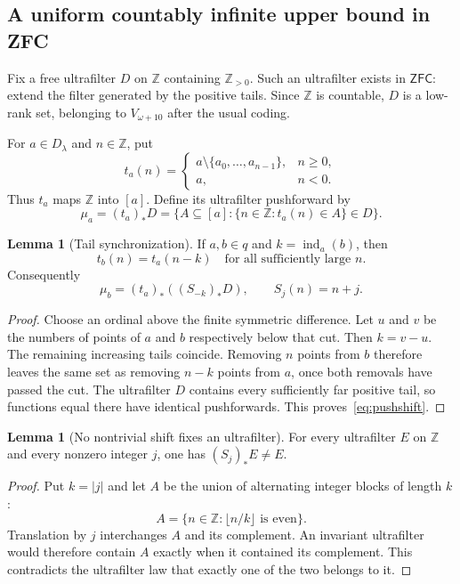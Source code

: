 \documentclass[11pt,letterpaper]{article}
\theoremstyle{definition}
\newtheorem{lemma}[definition]{Lemma}
\numberwithin{equation}{section}
\newcommand{\ZFC}{\mathsf{ZFC}}
\newcommand{\ind}{\operatorname{ind}}
\begin{document}
\subsection{A uniform countably infinite upper bound in ZFC}

Fix a free ultrafilter $D$ on $\mathbb Z$ containing $\mathbb Z_{>0}$. Such an ultrafilter exists in $\ZFC$: extend the filter generated by the positive tails. Since $\mathbb Z$ is countable, $D$ is a low-rank set, belonging to $V_{\omega+10}$ after the usual coding.

For $a\in D_\lambda$ and $n\in\mathbb Z$, put
\[
 t_a(n)=
 \begin{cases}
 a\setminus\{a_0,\ldots,a_{n-1}\},&n\geq0,\\
 a,&n<0.
 \end{cases}
\]
Thus $t_a$ maps $\mathbb Z$ into $[a]$. Define its ultrafilter pushforward by
\[
 \mu_a=(t_a)_*D
       =\{A\subseteq[a]:\{n\in\mathbb Z:t_a(n)\in A\}\in D\}.
\]

\begin{lemma}[Tail synchronization]\label{lem:sync}
If $a,b\in q$ and $k=\ind_a(b)$, then
\[
 t_b(n)=t_a(n-k)\quad\text{for all sufficiently large }n.
\]
Consequently
\begin{equation}\label{eq:pushshift}
 \mu_b=(t_a)_*((S_{-k})_*D),\qquad S_j(n)=n+j.
\end{equation}
\end{lemma}
\begin{proof}
Choose an ordinal above the finite symmetric difference. Let $u$ and $v$ be the numbers of points of $a$ and $b$ respectively below that cut. Then $k=v-u$. The remaining increasing tails coincide. Removing $n$ points from $b$ therefore leaves the same set as removing $n-k$ points from $a$, once both removals have passed the cut. The ultrafilter $D$ contains every sufficiently far positive tail, so functions equal there have identical pushforwards. This proves~\eqref{eq:pushshift}.
\end{proof}

\begin{lemma}[No nontrivial shift fixes an ultrafilter]\label{lem:shiftfree}
For every ultrafilter $E$ on $\mathbb Z$ and every nonzero integer $j$, one has $(S_j)_*E\ne E$.
\end{lemma}
\begin{proof}
Put $k=|j|$ and let $A$ be the union of alternating integer blocks of length $k$:
\[
 A=\{n\in\mathbb Z:\lfloor n/k\rfloor\text{ is even}\}.
\]
Translation by $j$ interchanges $A$ and its complement. An invariant ultrafilter would therefore contain $A$ exactly when it contained its complement. This contradicts the ultrafilter law that exactly one of the two belongs to it.
\end{proof}
\end{document}
